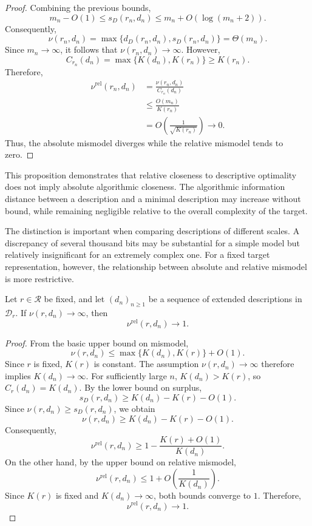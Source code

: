 \begin{proof}
Combining the previous bounds,
\[
m_n-O(1) \le s_D(r_n,d_n) \le m_n+O(\log(m_n+2)).
\]
Consequently,
\[
\nu(r_n,d_n) = \max\{d_D(r_n,d_n),s_D(r_n,d_n)\} = \Theta(m_n).
\]
Since $m_n\to\infty$, it follows that $\nu(r_n,d_n)\to\infty$. However,
\[
C_{r_n}(d_n) = \max\{K(d_n),K(r_n)\} \ge K(r_n).
\]
Therefore,
\[
\begin{aligned}
\nu^{\mathrm{rel}}(r_n,d_n)
& = \frac{\nu(r_n,d_n)}{C_{r_n}(d_n)}\\
& \le \frac{O(m_n)}{K(r_n)}\\
& = O\left(\frac{1}{\sqrt{K(r_n)}}\right) \to 0.
\end{aligned}
\]
Thus, the absolute mismodel diverges while the relative mismodel tends to zero.
\end{proof}

This proposition demonstrates that relative closeness to descriptive optimality does not imply absolute algorithmic closeness. The algorithmic information distance between a description and a minimal description may increase without bound, while remaining negligible relative to the overall complexity of the target.

The distinction is important when comparing descriptions of different scales. A discrepancy of several thousand bits may be substantial for a simple model but relatively insignificant for an extremely complex one. For a fixed target representation, however, the relationship between absolute and relative mismodel is more restrictive.

\begin{proposition}
\label{prop:fixed_target_rigidity_rel_mismodel}
Let $r\in\mathcal R$ be fixed, and let $(d_n)_{n\ge1}$ be a sequence of extended descriptions in $\mathcal D_r$. If $\nu(r,d_n)\to\infty$, then
\[
\nu^{\mathrm{rel}}(r,d_n)\to 1.
\]
\end{proposition}
\begin{proof}
From the basic upper bound on mismodel,
\[
\nu(r,d_n) \le \max\{K(d_n),K(r)\}+O(1).
\]
Since $r$ is fixed, $K(r)$ is constant. The assumption $\nu(r,d_n)\to\infty$ therefore implies $K(d_n)\to\infty$. For sufficiently large $n$, $K(d_n) > K(r)$, so $C_r(d_n) = K(d_n)$. By the lower bound on surplus,
\[
s_D(r,d_n)\ge K(d_n)-K(r)-O(1).
\]
Since $\nu(r,d_n)\ge s_D(r,d_n)$, we obtain
\[
\nu(r,d_n)\ge K(d_n)-K(r)-O(1).
\]
Consequently,
\[
\nu^{\mathrm{rel}}(r,d_n) \ge 1-\frac{K(r)+O(1)}{K(d_n)}.
\]
On the other hand, by the upper bound on relative mismodel,
\[
\nu^{\mathrm{rel}}(r,d_n) \le 1+O\left(\frac{1}{K(d_n)}\right).
\]
Since $K(r)$ is fixed and $K(d_n)\to\infty$, both bounds converge to $1$. Therefore,
\[
\nu^{\mathrm{rel}}(r,d_n)\to1.
\]
\end{proof}

